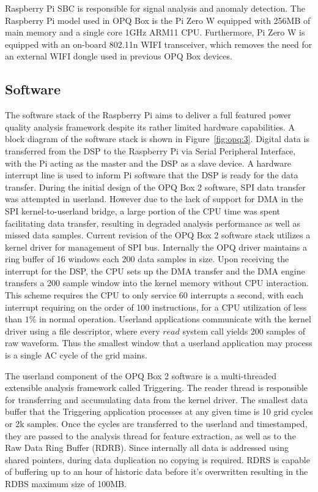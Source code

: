 Raspberry Pi SBC is responsible for signal analysis and anomaly detection.
The Raspberry Pi model used in OPQ Box is the Pi Zero W equipped with 256MB of main memory and a single core 1GHz ARM11 CPU. Furthermore, Pi Zero W is equipped with an on-board 802.11n WIFI transceiver, which removes the need for an external WIFI dongle used in previous OPQ Box devices.
\subsection{Software}\label{subsec:software}
The software stack of the Raspberry Pi aims to deliver a full featured power quality analysis framework despite its rather limited hardware capabilities.
A block diagram of the software stack is shown in Figure~\ref{fig:opq:3}.
Digital data is transferred from the DSP to the Raspberry Pi via Serial Peripheral Interface, with the Pi acting as the master and the DSP as a slave device.
A hardware interrupt line is used to inform Pi software that the DSP is ready for the data transfer.
During the initial design of the OPQ Box 2 software, SPI data transfer was attempted in userland.
However due to the lack of support for DMA in the SPI kernel-to-userland bridge, a large portion of the CPU time was spent facilitating data transfer, resulting in degraded analysis performance as well as missed data samples.
Current revision of the OPQ Box 2 software stack utilizes a kernel driver for management of SPI bus.
Internally the OPQ driver maintains a ring buffer of 16 windows each 200 data samples in size.
Upon receiving the interrupt for the DSP, the CPU sets up the DMA transfer and the DMA engine transfers a 200 sample window into the kernel memory without CPU interaction.
This scheme requires the CPU to only service 60 interrupts a second, with each interrupt requiring on the order of 100 instructions, for a CPU utilization of less than $1\%$ in normal operation.
Userland applications communicate with the kernel driver using a file descriptor, where every $read$ system call yields 200 samples of raw waveform.
Thus the smallest window that a userland application may process is a single AC cycle of the grid mains.

The userland component of the OPQ Box 2 software is a multi-threaded extensible analysis framework called Triggering.
The reader thread is responsible for transferring and accumulating data from the kernel driver.
The smallest data buffer that the Triggering application processes at any given time is 10 grid cycles or 2k samples.
Once the cycles are transferred to the userland and timestamped, they are passed to the analysis thread for feature extraction, as well as to the Raw Data Ring Buffer (RDRB).
Since internally all data is addressed using shared pointers, during data duplication no copying is required.
RDRS is capable of buffering up to an hour of historic data before it's overwritten resulting in the RDBS maximum size of 100MB.

